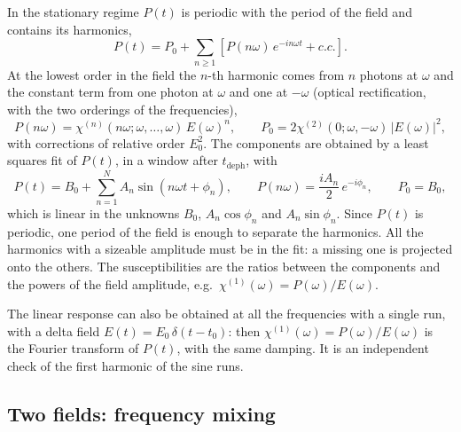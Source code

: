 \documentclass[10pt,a4paper]{paper}
\begin{document}
In the stationary regime $P(t)$ is periodic with the period of the field and contains its harmonics,
\begin{equation}
P(t) = P_0 + \sum_{n\geq1}\left[P(n\omega)\,e^{-in\omega t} + c.c.\right] .
\label{eq:P_harmonics}
\end{equation}
At the lowest order in the field the $n$-th harmonic comes from $n$ photons at $\omega$ and the constant term from one
photon at $\omega$ and one at $-\omega$ (optical rectification, with the two orderings of the frequencies),
\begin{equation}
P(n\omega) = \chi^{(n)}(n\omega;\omega,\dots,\omega)\,E(\omega)^n , \qquad
P_0 = 2\chi^{(2)}(0;\omega,-\omega)\,|E(\omega)|^2 ,
\label{eq:P_single}
\end{equation}
with corrections of relative order $E_0^2$. The components are obtained by a least squares fit of $P(t)$, in a
window after $t_{\mathrm{deph}}$, with
\begin{equation}
P(t) = B_0 + \sum_{n=1}^{N}A_n\sin(n\omega t+\phi_n) , \qquad P(n\omega) = \frac{iA_n}{2}\,e^{-i\phi_n} , \qquad
P_0 = B_0 ,
\label{eq:fit}
\end{equation}
which is linear in the unknowns $B_0$, $A_n\cos\phi_n$ and $A_n\sin\phi_n$. Since $P(t)$ is periodic, one period of the
field is enough to separate the harmonics. All the harmonics with a sizeable amplitude must be in the fit: a missing
one is projected onto the others. The susceptibilities are the ratios between the components and the powers of the
field amplitude, e.g.\ $\chi^{(1)}(\omega) = P(\omega)/E(\omega)$.

The linear response can also be obtained at all the frequencies with a single run, with a delta field
$E(t) = E_0\,\delta(t-t_0)$: then $\chi^{(1)}(\omega) = P(\omega)/E(\omega)$ is the Fourier transform of $P(t)$, with the
same damping. It is an independent check of the first harmonic of the sine runs.

\subsection{Two fields: frequency mixing}
\label{sec:extraction_mixing}
\end{document}

